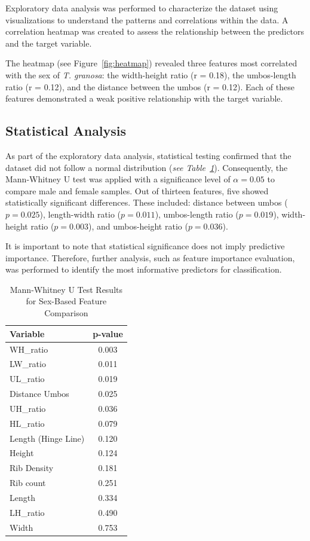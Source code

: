 Exploratory data analysis was performed to characterize the dataset using visualizations to understand the patterns and correlations within the data. A correlation heatmap was created to assess the relationship between the predictors and the target variable.

The heatmap (see Figure~\ref{fig:heatmap}) revealed three features most correlated with the sex of \textit{T. granosa}: the width-height ratio (r = 0.18), the umbos-length ratio (r = 0.12), and the distance between the umbos (r = 0.12). Each of these features demonstrated a weak positive relationship with the target variable. 

\subsection{Statistical Analysis}

As part of the exploratory data analysis, statistical testing confirmed that the dataset did not follow a normal distribution (\textit{see Table~\ref{tab:mann-whitney}}). Consequently, the Mann-Whitney U test was applied with a significance level of $\alpha = 0.05$ to compare male and female samples. Out of thirteen features, five showed statistically significant differences. These included: distance between umbos ($p = 0.025$), length-width ratio ($p = 0.011$), umbos-length ratio ($p = 0.019$), width-height ratio ($p = 0.003$), and umbos-height ratio ($p = 0.036$). 

It is important to note that statistical significance does not imply predictive importance. Therefore, further analysis, such as feature importance evaluation, was performed to identify the most informative predictors for classification.

\begin{table}[H]
	\centering
	\small %
	\begin{tabular}{lc}
		\hline
		\textbf{Variable} & \textbf{p-value} \\ \hline
		WH\_ratio & 0.003 \\
		LW\_ratio & 0.011 \\
		UL\_ratio & 0.019 \\
		Distance Umbos & 0.025 \\
		UH\_ratio & 0.036 \\
		HL\_ratio & 0.079 \\
		Length (Hinge Line) & 0.120 \\
		Height & 0.124 \\
		Rib Density & 0.181 \\
		Rib count & 0.251 \\
		Length & 0.334 \\
		LH\_ratio & 0.490 \\
		Width & 0.753 \\ \hline

	\end{tabular}
	
	\caption{Mann-Whitney U Test Results for Sex-Based Feature Comparison}
	\label{tab:mann-whitney}
\end{table}

